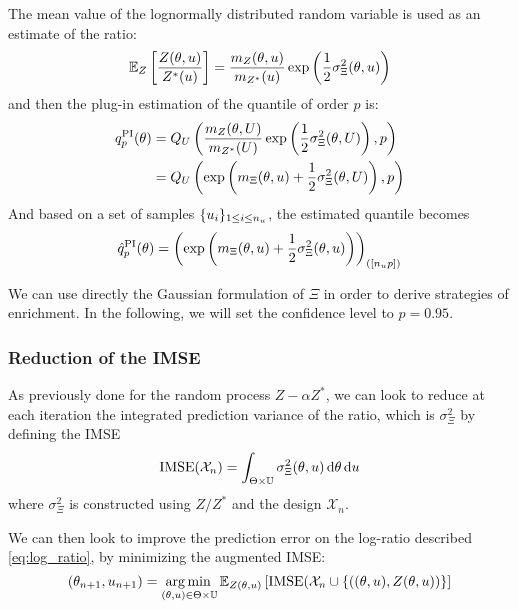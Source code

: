 \documentclass[../../Main_ManuscritThese.tex]{subfiles}
\begin{document}
The mean value of the lognormally distributed random variable is used
as an estimate of the ratio:
\begin{equation}
  \label{eq:mean_ratio_logn}
\mathbb{E}_Z\left[\frac{Z(\theta, u)}{Z^*(u)}\right] = \frac{m_Z(\theta, u)}{m_{Z^*}(u)}\exp\left(\frac{1}{2}\sigma^2_{\Xi}(\theta, u)\right) 
\end{equation}
and then the plug-in estimation of the quantile of
order $p$ is:
\begin{align}
  {q}^{\mathrm{PI}}_p(\theta) &= Q_{U}\left(\frac{m_Z(\theta, U)}{m_{Z^*}(U)}\exp\left(\frac{1}{2}\sigma^2_{\Xi}(\theta, U)\right),p \right)\\ &= Q_{U}\left(\exp\left(m_{\Xi}(\theta, u)+\frac{1}{2}\sigma^2_{\Xi}(\theta, U)\right),p \right)
\end{align}
And based on a set of samples $\{u_i\}_{1\leq i \leq n_{u}}$, the estimated quantile becomes
\begin{equation}
  \hat{q}^{\mathrm{PI}}_p(\theta) = {\left(\exp\left(m_{\Xi}(\theta, u)+\frac{1}{2}\sigma^2_{\Xi}(\theta, u)\right)\right)}_{\left(\left[n_{u}p\right]\right)}
\end{equation}


We can use directly the Gaussian formulation of $\Xi$ in order to
derive strategies of enrichment. In the following, we will set the
confidence level to $p=0.95$.
  
  \subsubsection{Reduction of the IMSE}
  \label{ssec:reduction_imse_quantile}
  As previously done for the random process $Z - \alpha Z^*$, we can
  look to reduce at each iteration the integrated prediction variance
  of the ratio, which is $\sigma^2_{\Xi}$ by defining the IMSE
\begin{equation}
  \operatorname{\mathrm{IMSE}}(\mathcal{X}_n) = \int_{\Theta\times\mathbb{U}} \sigma_{\Xi}^2(\theta, u) \,\mathrm{d}\theta\,\mathrm{d}u
\end{equation}
where $\sigma_\Xi^2$ is constructed using $Z/Z^*$ and the design $\mathcal{X}_n$.

We can then look to improve the prediction error on the log-ratio
described \cref{eq:log_ratio}, by minimizing the augmented IMSE:
\begin{equation}
  \label{eq:aIMSE_Xi}
 (\theta_{n+1}, u_{n+1}) = \operatorname*{arg\,min \,}_{(\theta, u) \in \Theta \times \mathbb{U}}\mathbb{E}_{Z(\theta,u)}\left[\operatorname{\mathrm{IMSE}}(\mathcal{X}_n \cup \left\{\left((\theta, u),Z(\theta, u)\right)\right\}\right]
\end{equation}
\end{document}
